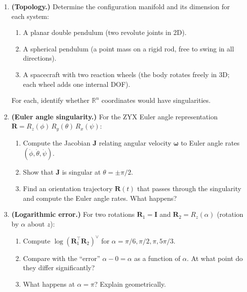 \documentclass[12pt, openany]{book}
\theoremstyle{plain}
\newcommand{\Reals}{\mathbb{R}}
\begin{document}
\begin{enumerate}[label=\textbf{3.\arabic*.}, leftmargin=1.5cm]

\item \textbf{(Topology.)} Determine the configuration manifold and its
  dimension for each system:
  \begin{enumerate}[label=(\alph*)]
    \item A planar double pendulum (two revolute joints in 2D).
    \item A spherical pendulum (a point mass on a rigid rod, free to swing
      in all directions).
    \item A spacecraft with two reaction wheels (the body rotates freely in
      3D; each wheel adds one internal DOF).
  \end{enumerate}
  For each, identify whether $\Reals^n$ coordinates would have singularities.

\item \textbf{(Euler angle singularity.)} For the ZYX Euler angle representation
  $\bm{R} = R_z(\phi)\, R_y(\theta)\, R_x(\psi)$:
  \begin{enumerate}[label=(\alph*)]
    \item Compute the Jacobian $\bm{J}$ relating angular velocity
      $\bm{\omega}$ to Euler angle rates $(\dot{\phi}, \dot{\theta}, \dot{\psi})$.
    \item Show that $\bm{J}$ is singular at $\theta = \pm\pi/2$.
    \item Find an orientation trajectory $\bm{R}(t)$ that passes through the
      singularity and compute the Euler angle rates. What happens?
  \end{enumerate}

\item \textbf{(Logarithmic error.)} For two rotations
  $\bm{R}_1 = \bm{I}$ and $\bm{R}_2 = R_z(\alpha)$ (rotation by $\alpha$
  about $z$):
  \begin{enumerate}[label=(\alph*)]
    \item Compute $\log(\bm{R}_1^\top\bm{R}_2)^\vee$ for
      $\alpha = \pi/6, \pi/2, \pi, 5\pi/3$.
    \item Compare with the ``error'' $\alpha - 0 = \alpha$ as a function of
      $\alpha$. At what point do they differ significantly?
    \item What happens at $\alpha = \pi$? Explain geometrically.
  \end{enumerate}


\end{enumerate}
\end{document}
